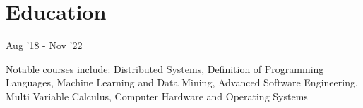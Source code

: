 \documentclass[]{deedy-resume-openfont}
\begin{document}
\begin{minipage}[t]{0.95\textwidth}
\sectionsep

\section{Education}
\subtitle{BSc in Computer Science, University of British Columbia}{Aug '18 - Nov '22}

Notable courses include: Distributed Systems, Definition of Programming Languages, Machine Learning and Data Mining, Advanced Software Engineering, Multi Variable Calculus, Computer Hardware and Operating Systems

\end{minipage} 
\end{document}
